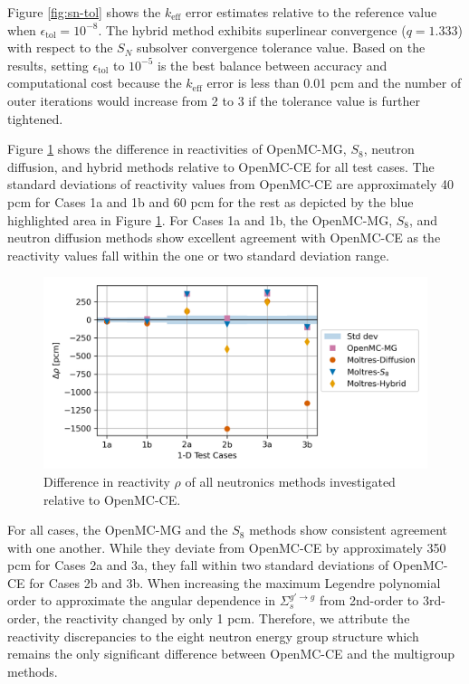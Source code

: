 \documentclass[letterpaper]{mc2025}
\begin{document}
Figure \ref{fig:sn-tol} shows the $k_\text{eff}$ error estimates relative to the reference value
when $\epsilon_\text{tol}=10^{-8}$. The hybrid method exhibits superlinear convergence ($q=1.333$)
with respect to the $S_N$ subsolver convergence tolerance value. Based on the results, setting
$\epsilon_\text{tol}$ to $10^{-5}$ is the best balance between accuracy and computational
cost because the $k_\text{eff}$ error is less than 0.01 pcm and the number of outer iterations
would increase from 2 to 3 if the tolerance value is further tightened.


Figure \ref{fig:1d-rho} shows the difference in reactivities of OpenMC-MG, $S_8$, neutron
diffusion, and hybrid methods relative to OpenMC-CE for all test cases. The standard deviations of
reactivity values from OpenMC-CE are approximately 40 pcm for Cases 1a and 1b and 60 pcm for the
rest as depicted by the blue highlighted area in Figure \ref{fig:1d-rho}. For Cases 1a and 1b, the
OpenMC-MG, $S_8$, and neutron diffusion methods show excellent agreement with OpenMC-CE as the
reactivity values fall within the one or two standard deviation range.
%
\begin{figure}[htb!]
  \centering
  \includegraphics[width=0.75\columnwidth]{rho}
  \caption{Difference in reactivity $\rho$ of all neutronics methods investigated relative
  to OpenMC-CE.}
  \label{fig:1d-rho}
\end{figure}

For all cases, the OpenMC-MG and the $S_8$ methods show consistent agreement with one another. 
While they deviate from OpenMC-CE by approximately 350 pcm for Cases 2a and 3a, they fall within
two standard deviations of OpenMC-CE for Cases 2b and 3b. When increasing the maximum Legendre
polynomial order to approximate the angular dependence in $\Sigma_s^{g'\rightarrow g}$ from
2nd-order to 3rd-order, the reactivity changed by only 1 pcm. Therefore, we attribute the reactivity
discrepancies to the eight neutron energy group structure which remains the
only significant difference between OpenMC-CE and the multigroup methods.
\end{document}
